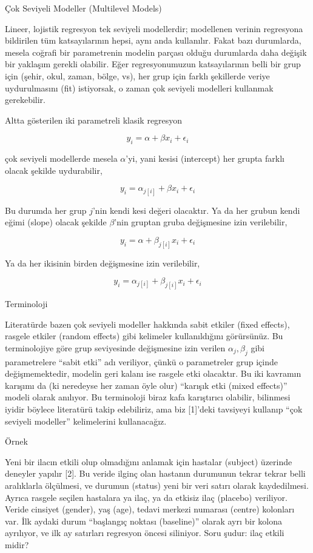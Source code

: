 \documentclass[12pt,fleqn]{article}\usepackage{../../common}
\begin{document}
Çok Seviyeli Modeller (Multilevel Models)

Lineer, lojistik regresyon tek seviyeli modellerdir; modellenen verinin
regresyona bildirilen tüm katsayılarının hepsi, aynı anda kullanılır. Fakat
bazı durumlarda, mesela coğrafi bir parametrenin modelin parçası olduğu
durumlarda daha değişik bir yaklaşım gerekli olabilir. Eğer regresyonumuzun
katsayılarının belli bir grup için (şehir, okul, zaman, bölge, vs), her
grup için farklı şekillerde veriye uydurulmasını (fit) istiyorsak, o zaman
çok seviyeli modelleri kullanmak gerekebilir.

Altta gösterilen iki parametreli klasik regresyon 

$$ y_i = \alpha + \beta x_i + \epsilon_i $$

çok seviyeli modellerde mesela $\alpha$'yi, yani kesisi (intercept) her
grupta farklı olacak şekilde uydurabilir,

$$ y_i = \alpha_{j[i]} + \beta x_i + \epsilon_i $$

Bu durumda her grup $j$'nin kendi kesi değeri olacaktır. Ya da her grubun
kendi eğimi (slope) olacak şekilde $\beta$'nin gruptan gruba değişmesine
izin verilebilir,

$$ y_i = \alpha + \beta_{j[i]} x_i + \epsilon_i $$

Ya da her ikisinin birden değişmesine izin verilebilir,

$$ y_i = \alpha_{j[i]} + \beta_{j[i]} x_i + \epsilon_i $$

Terminoloji

Literatürde bazen çok seviyeli modeller hakkında sabit etkiler (fixed
effects), rasgele etkiler (random effects) gibi kelimeler kullanıldığını
görürsünüz. Bu terminolojiye göre grup seviyesinde değişmesine izin verilen
$\alpha_j,\beta_j$ gibi parametrelere ``sabit etki'' adı veriliyor, çünkü o
parametreler grup içinde değişmemektedir, modelin geri kalanı ise rasgele
etki olacaktır. Bu iki kavramın karışımı da (ki neredeyse her zaman öyle
olur) ``karışık etki (mixed effects)'' modeli olarak anılıyor. Bu
terminoloji biraz kafa karıştırıcı olabilir, bilinmesi iyidir böylece
literatürü takip edebiliriz, ama biz [1]'deki tavsiyeyi kullanıp ``çok
seviyeli modeller'' kelimelerini kullanacağız.

Örnek

Yeni bir ilacın etkili olup olmadığını anlamak için hastalar (subject)
üzerinde deneyler yapılır [2]. Bu veride ilginç olan hastanın durumunun
tekrar tekrar belli aralıklarla ölçülmesi, ve durumun (status) yeni bir
veri satırı olarak kaydedilmesi. Ayrıca rasgele seçilen hastalara ya ilaç,
ya da etkisiz ilaç (placebo) veriliyor. Veride cinsiyet (gender), yaş
(age), tedavi merkezi numarası (centre) kolonları var. İlk aydaki durum
``başlangıç noktası (baseline)'' olarak ayrı bir kolona ayrılıyor, ve ilk
ay satırları regresyon öncesi siliniyor. Soru şudur: ilaç etkili midir?
\end{document}
